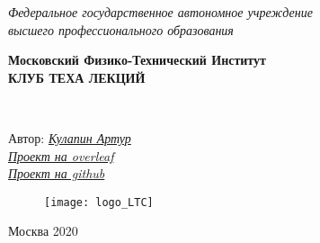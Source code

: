 \begin{titlepage}
	\clearpage\thispagestyle{empty}
	\centering
	
	\textit{Федеральное государственное автономное учреждение \\
		высшего профессионального образования}
	\vspace{0.5ex}
	
	\textbf{Московский Физико-Технический Институт \\ КЛУБ ТЕХА ЛЕКЦИЙ}
	\vspace{20ex}
	\vspace{13ex}
	
	\\
	
	\vspace{1ex}
	Автор: \href{https://vk.com/kulart00}{\textit{Кулапин Артур}}
	\\
	\href{https://www.overleaf.com/read/hgdqksrpzrbt}{\textit{Проект на overleaf}}
	\\
	\href{https://github.com/MIPT-Group/Lectures_Tex_Club/tree/master/guides/intermediate}{\textit{Проект на github}}
	
	
	\begin{figure}[!ht]
		\centering
		\texttt{[image: logo\_LTC]}
		\label{fig:my_label}
	\end{figure}

	\vfill
	Москва 2020 
	\pagebreak
	
\end{titlepage}
